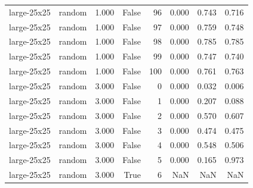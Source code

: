 \begin{tabular}{llrrrrrr}
large-25x25 & random & 1.000 & False & 96 & 0.000 & 0.743 & 0.716 \\
large-25x25 & random & 1.000 & False & 97 & 0.000 & 0.759 & 0.748 \\
large-25x25 & random & 1.000 & False & 98 & 0.000 & 0.785 & 0.785 \\
large-25x25 & random & 1.000 & False & 99 & 0.000 & 0.747 & 0.740 \\
large-25x25 & random & 1.000 & False & 100 & 0.000 & 0.761 & 0.763 \\
large-25x25 & random & 3.000 & False & 0 & 0.000 & 0.032 & 0.006 \\
large-25x25 & random & 3.000 & False & 1 & 0.000 & 0.207 & 0.088 \\
large-25x25 & random & 3.000 & False & 2 & 0.000 & 0.570 & 0.607 \\
large-25x25 & random & 3.000 & False & 3 & 0.000 & 0.474 & 0.475 \\
large-25x25 & random & 3.000 & False & 4 & 0.000 & 0.548 & 0.506 \\
large-25x25 & random & 3.000 & False & 5 & 0.000 & 0.165 & 0.973 \\
large-25x25 & random & 3.000 & True & 6 & NaN & NaN & NaN \\
\bottomrule
\end{tabular}
